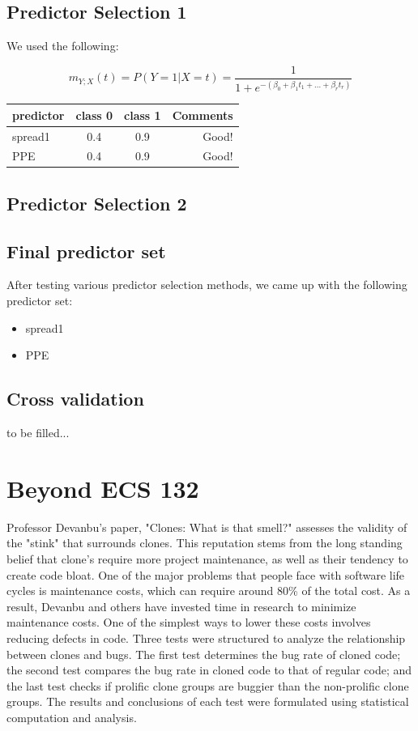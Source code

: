 \documentclass{article}
\begin{document}
\subsection{Predictor Selection 1}

We used the following:

\begin{equation}
\label{logit2}
m_{Y;X}(t) = P(Y = 1 | X = t) = \frac{1}{1+e^{-(\beta_0+\beta_1
t_1+...+\beta_r t_r)}}
\end{equation}

\begin{tabular}{l|c|c|r}
predictor & class 0 & class 1 & Comments \\
\hline
spread1 & 0.4 & 0.9 & Good! \\
PPE & 0.4 & 0.9 & Good! \\
\end{tabular}

\subsection{Predictor Selection 2}

\subsection{Final predictor set}

After testing various predictor selection methods, we came up with the following predictor set:
\begin{itemize}
	\item spread1
	\item PPE
\end{itemize}

\subsection{Cross validation}

to be filled...


\section{Beyond ECS 132}

Professor Devanbu's paper, "Clones: What is that smell?" assesses the validity of the "stink"
that surrounds clones.  This reputation stems from the long standing belief that clone's require
more project maintenance, as well as their tendency to create code bloat. One of the major
problems that people face with software life cycles is maintenance costs, which can require
around 80\% of the total cost. As a result, Devanbu and others have invested time in research
to minimize maintenance costs. One of the simplest ways to lower these costs involves
reducing defects in code. Three tests were structured to analyze the relationship between
clones and bugs. The first test determines the bug rate of cloned code; the second test
compares the bug rate in cloned code to that of regular code; and the last test checks
if prolific clone groups are buggier than the non-prolific clone groups. The results and
conclusions of each test were formulated using statistical computation and analysis.
\end{document}
